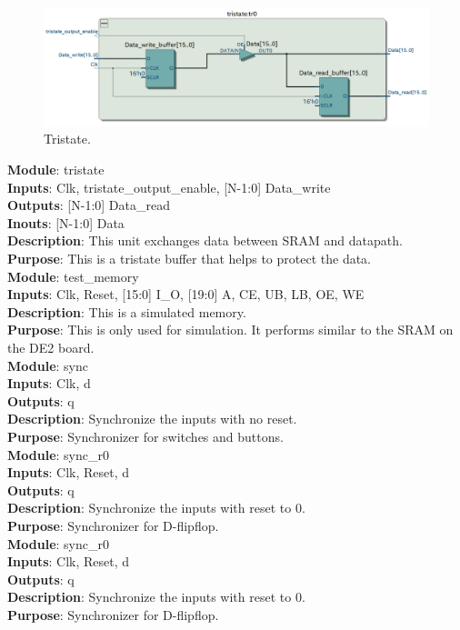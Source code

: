 \documentclass[12pt]{article}
\begin{document}
\begin{figure}[H]
    \centering
    \includegraphics[width=15cm]{tristate.png}
    \caption{Tristate.}
\end{figure}
\textbf{Module}: tristate \\ 
\textbf{Inputs}: Clk, tristate\_output\_enable, [N-1:0] Data\_write \\ 
\textbf{Outputs}: [N-1:0] Data\_read \\ 
\textbf{Inouts}: [N-1:0] Data \\
\textbf{Description}: This unit exchanges data between SRAM and datapath. \\
\textbf{Purpose}: This is a tristate buffer that helps to protect the data. \\

\textbf{Module}: test\_memory \\ 
\textbf{Inputs}: Clk, Reset, [15:0] I\_O, [19:0] A, CE, UB, LB, OE, WE \\ 
\textbf{Description}: This is a simulated memory. \\
\textbf{Purpose}: This is only used for simulation. It performs similar to the SRAM on the DE2 board. \\

\textbf{Module}: sync \\ 
\textbf{Inputs}: Clk, d \\ 
\textbf{Outputs}: q \\ 
\textbf{Description}: Synchronize the inputs with no reset. \\
\textbf{Purpose}: Synchronizer for switches and buttons. \\

\textbf{Module}: sync\_r0 \\ 
\textbf{Inputs}: Clk, Reset, d \\ 
\textbf{Outputs}: q \\ 
\textbf{Description}: Synchronize the inputs with reset to 0. \\
\textbf{Purpose}: Synchronizer for D-flipflop. \\

\textbf{Module}: sync\_r0 \\ 
\textbf{Inputs}: Clk, Reset, d \\ 
\textbf{Outputs}: q \\ 
\textbf{Description}: Synchronize the inputs with reset to 0. \\
\textbf{Purpose}: Synchronizer for D-flipflop. \\
\end{document}
